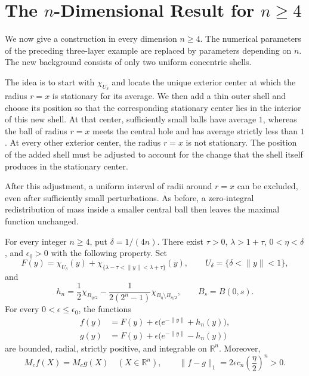 \documentclass[12pt]{amsart}
\numberwithin{equation}{section}
\begin{document}
\section{The $n$-Dimensional Result for $n\geq4$}
\label{n_dimensional_result}

We now give a construction in every dimension $n\geq4$. The numerical
parameters of the preceding three-layer example are replaced by
parameters depending on $n$. The new background consists of only two
uniform concentric shells.

The idea is to start with $\chi_{U_\delta}$ and locate the unique
exterior center at which the radius $r=x$ is stationary for its
average. We then add a thin outer shell and choose its position so
that the corresponding stationary center lies in the interior of
this new shell. At that center, sufficiently small balls have average
$1$, whereas the ball of radius $r=x$ meets the central hole and has
average strictly less than $1$. At every other exterior center, the
radius $r=x$ is not stationary. The position of the added shell must
be adjusted to account for the change that the shell itself produces
in the stationary center.

After this adjustment, a uniform interval of radii around $r=x$ can
be excluded, even after sufficiently small perturbations. As before,
a zero-integral redistribution of mass inside a smaller central ball
then leaves the maximal function unchanged.

\begin{theorem}
\label{n_dimensional_theorem}
For every integer $n\geq4$, put $\delta=1/(4n)$. There exist
$\tau>0$, $\lambda>1+\tau$, $0<\eta<\delta$, and $\epsilon_0>0$
with the following property. Set
\begin{equation}
\label{n_dimensional_background}
F(y)=\chi_{U_\delta}(y)
 +\chi_{\{\lambda-\tau<\|y\|<\lambda+\tau\}}(y),
\qquad U_\delta=\{\delta<\|y\|<1\},
\end{equation}
and
\begin{equation}
\label{n_dimensional_perturbation}
h_n=\frac12\chi_{B_{\eta/2}}
 -\frac{1}{2(2^n-1)}\chi_{B_\eta\setminus B_{\eta/2}},
\qquad B_s=B(0,s).
\end{equation}
For every $0<\epsilon\leq\epsilon_0$, the functions
\begin{equation}
\label{n_dimensional_pair}
\begin{aligned}
f(y)&=F(y)+\epsilon\bigl(e^{-\|y\|}+h_n(y)\bigr),\\
g(y)&=F(y)+\epsilon\bigl(e^{-\|y\|}-h_n(y)\bigr)
\end{aligned}
\end{equation}
are bounded, radial, strictly positive, and integrable on
$\mathbb{R}^n$. Moreover,
\begin{equation}
\label{n_dimensional_conclusion}
M_cf(X)=M_cg(X)\quad(X\in\mathbb{R}^n),
\qquad
\|f-g\|_1=2\epsilon c_n\left(\frac{\eta}{2}\right)^n>0.
\end{equation}
\end{theorem}
\end{document}
